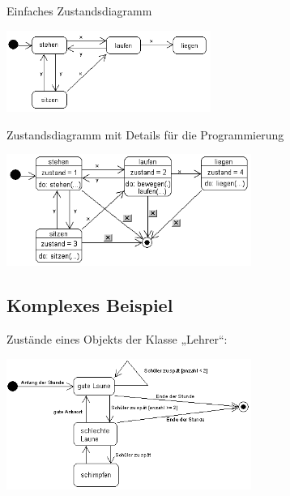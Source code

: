 \begin{compactenum}[a)]
\item Einfaches Zustandsdiagramm

\begin{center}
\includegraphics[width=0.5\textwidth]{./inf/SEKII/11_UML_Zustandsdiagramme/zustandsdiagrammMaennchenEinfach.png}
\end{center}

\item Zustandsdiagramm mit Details für die Programmierung

\begin{center}
\includegraphics[width=0.6\textwidth]{./inf/SEKII/11_UML_Zustandsdiagramme/zustandsdiagrammMaennchenDetailliert.png}
\end{center}

\end{compactenum}

\pagebreak


\subsection{Komplexes Beispiel}

Zustände eines Objekts der Klasse „Lehrer“:

\begin{center}
\includegraphics[width=0.6\textwidth]{./inf/SEKII/11_UML_Zustandsdiagramme/zustandsdiagrammLehrer.png}
\end{center}

